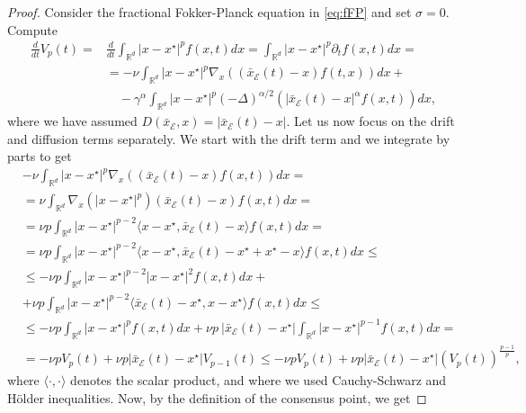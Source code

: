 \documentclass[11pt,handout]{article}%
\numberwithin{equation}{section}
\newcommand{\R}{\mathbb R}
\theoremstyle{definition}
\begin{document}
\begin{proof}
	Consider the fractional Fokker-Planck equation in \eqref{eq:fFP} and set $\sigma=0$. Compute 
	\begin{equation}\label{eq:proof1} 
		\begin{split}
			\frac{d}{dt}V_p(t) = &\frac{d}{dt}\int_{\R^d} \vert x-x^\star \vert^p f(x,t) dx = \int_{\R^d} \vert x-x^\star \vert^p \partial_t f(x,t) dx = \\
			& = -\nu \int_{\R^d} \vert x-x^\star \vert^p \nabla_x\left(  (\bar{x}_\mathcal{E}(t)-x)f(t,x)\right)  dx +\\
			&\quad -\gamma^\alpha \int_{\R^d} \vert x-x^\star \vert^p (-\Delta)^{\alpha/2}\left(  \vert \bar{x}_\mathcal{E}(t)-x\vert^\alpha f(x,t)\right)  dx,
		\end{split} 
	\end{equation}
	where we have assumed $D(\bar{x}_\mathcal{E},x) = \vert \bar{x}_\mathcal{E}(t)-x\vert$. Let us now focus on the drift and diffusion terms separately. We start with the drift term and we integrate by parts to get 
	\begin{align*}
		&-\nu \int_{\R^d} \vert x-x^\star \vert^p \nabla_x\left(  (\bar{x}_\mathcal{E}(t)-x)f(x,t)\right)  dx 	=\\&= \nu \int_{\R^d} \nabla_x (\vert x-x^\star\vert^p) (\bar{x}_\mathcal{E}(t)-x) f(x,t) dx = \\ 
		& = \nu p \int_{\R^d} \vert x-x^\star \vert^{p-2} \langle x-x^\star, \bar{x}_\mathcal{E}(t)-x\rangle f(x,t) dx =\\ & = \nu p \int_{\R^d}  \vert x-x^\star \vert^{p-2} \langle x-x^\star, \bar{x}_\mathcal{E}(t)-x^\star + x^\star - x\rangle f(x,t) dx \leq \\  & \leq -\nu p \int_{\R^d} \vert x-x^\star \vert^{p-2} \vert x-x^\star \vert^2 f(x,t) dx +\\&+ \nu p \int_{\R^d} \vert x-x^\star \vert^{p-2} \langle \bar{x}_\mathcal{E}(t)-x^\star, x-x^\star\rangle f(x,t)dx \leq \\
		&\leq  -\nu p \int_{\R^d} \vert x-x^\star \vert^{p}   f(x,t) dx + \nu p ~ \vert \bar{x}_\mathcal{E}(t)-x^\star \vert \int_{\R^d} \vert x-x^\star \vert^{p-1} f(x,t) dx =\\ & = -\nu p V_p(t) + \nu p \vert \bar{x}_\mathcal{E}(t)-x^\star \vert V_{p-1}(t)   \leq -\nu p V_p(t) + \nu p  \vert \bar{x}_\mathcal{E}(t)-x^\star \vert \left( V_p(t)\right)^{\frac{p-1}{p}},
	\end{align*} 
	where $\langle \cdot,\cdot \rangle$ denotes the scalar product, and where we used Cauchy-Schwarz and H{\"o}lder inequalities. Now, by the definition of the consensus point, we get

\end{proof}
\end{document}
